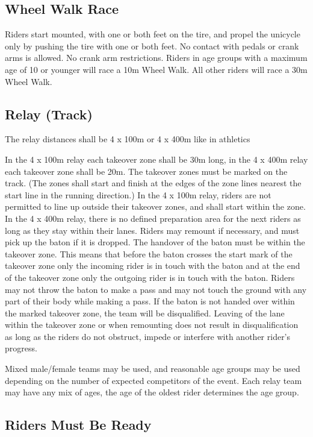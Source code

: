 \subsection{Wheel Walk Race}

Riders start mounted, with one or both feet on the tire, and propel the unicycle only by pushing the tire with one or both feet.
No contact with pedals or crank arms is allowed.
No crank arm restrictions.
Riders in age groups with a maximum age of 10 or younger will race a 10m Wheel Walk.
All other riders will race a 30m Wheel Walk.

\subsection{Relay (Track)}
The relay distances shall be 4 x 100m or 4 x 400m like in athletics

In the 4 x 100m relay each takeover zone shall be 30m long, in the 4 x 400m relay each takeover zone shall be 20m.
The takeover zones must be marked on the track.
(The zones shall start and finish at the edges of the zone lines nearest the start line in the running direction.)
In the 4 x 100m relay, riders are not permitted to line up outside their takeover zones, and shall start within the zone.
In the 4 x 400m relay, there is no defined preparation area for the next riders as long as they stay within their lanes.
Riders may remount if necessary, and must pick up the baton if it is dropped.
The handover of the baton must be within the takeover zone.
This means that before the baton crosses the start mark of the takeover zone only the incoming rider is in touch with the baton and at the end of the takeover zone only the outgoing rider is in touch with the baton.
Riders may not throw the baton to make a pass and may not touch the ground with any part of their body while making a pass.
If the baton is not handed over within the marked takeover zone, the team will be disqualified.
Leaving of the lane within the takeover zone or when remounting does not result in disqualification as long as the riders do not obstruct, impede or interfere with another rider’s progress.

Mixed male/female teams may be used, and reasonable age groups may be used depending on the number of expected competitors of the event.
Each relay team may have any mix of ages, the age of the oldest rider determines the age group.

\subsection{Riders Must Be Ready}

